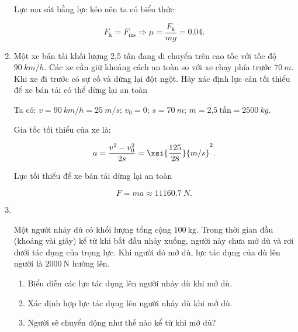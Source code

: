 \begin{enumerate}[label=\bfseries Bài \arabic*:]
	\hideall
	{
		Lực ma sát bằng lực kéo nên ta có biểu thức:
		
		$$F_\text{k} = F_\text{ms} \Rightarrow \mu = \dfrac{F_\text{k}}{mg} =\text{0,04}.$$
	}
	
		\item {}
	
	
	{ 
		Một xe bán tải khối lượng 2,5 tấn đang di chuyển trên cao tốc với tốc độ $\SI{90}{km/h}$. Các xe cần giữ khoảng cách an toàn so với xe chạy phía trước $\SI{70}{m}$. Khi xe đi trước có sự cố và dừng lại đột ngột. Hãy xác định lực cản tối thiểu để xe bán tải có thể dừng lại an toàn
		
	}
	
	\hideall
	{
		Ta có: $v = \SI{90}{km/h} = \SI{25}{m/s}$; $v_0 = 0$; $s = \SI{70}{m}$; $m = \text{2,5}\ \text{tấn} = \SI{2500}{kg}.$
		
		Gia tốc tối thiểu của xe là:
		
		$$a = \dfrac{v^2 - v_0^2}{2s} = \xsi{\dfrac{125}{28}}{m/s}^2.$$
		
		Lực tối thiểu để xe bán tải dừng lại an toàn
		
		$$F = ma \approx \SI{11160,7}{N}.$$
		
		
	}
	
	\item{}\\
	{Một người nhảy dù có khối lượng tổng cộng $\SI{100}{\kilogram}$. Trong thời gian đầu (khoảng vài giây) kể từ khi bắt đầu nhảy xuống, người này chưa mở dù và rơi dưới tác dụng của trọng lực. Khi người đó mở dù, lực tác dụng của dù lên người là $\SI{2000}{\newton}$ hướng lên.
		\begin{enumerate}[label=\alph*)]
			\item Biểu diễn các lực tác dụng lên người nhảy dù khi mở dù.
			\item Xác định hợp lực tác dụng lên người nhảy dù khi mở dù.
			\item Người sẽ chuyển động như thế nào kể từ khi mở dù?
		\end{enumerate}
	
}
\end{enumerate}
